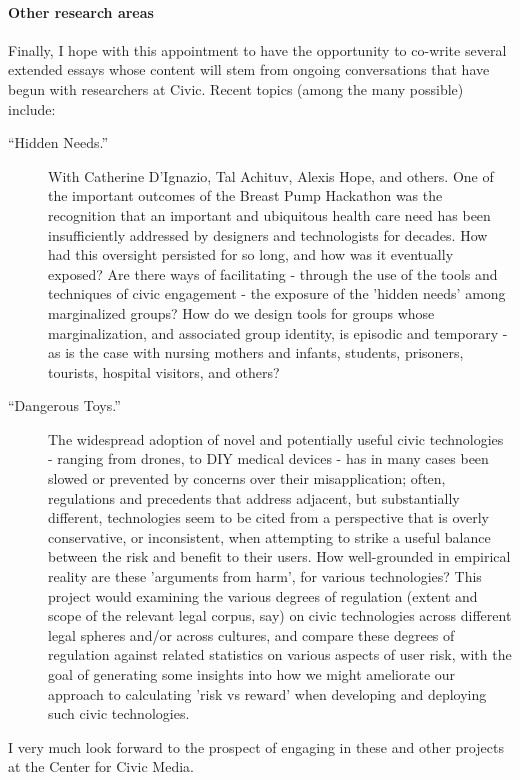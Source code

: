 \documentclass[10pt]{article}
\begin{document}

\paragraph{Other research areas} Finally, I hope with this appointment to have the opportunity to co-write several extended essays whose content will stem from ongoing conversations that have begun with researchers at Civic.  Recent topics (among the many possible) include: 

\begin{description}

\item[``Hidden Needs.''] With Catherine D'Ignazio, Tal Achituv, Alexis Hope, and others.  One of the important outcomes of the Breast Pump Hackathon was the recognition that an important and ubiquitous health care need has been insufficiently addressed by designers and technologists for decades. How had this oversight persisted for so long, and how was it eventually exposed?  Are there ways of facilitating - through the use of the tools and techniques of civic engagement - the exposure of the 'hidden needs' among marginalized groups?  How do we design tools for groups whose marginalization, and associated group identity, is episodic and temporary - as is the case with nursing mothers and infants, students, prisoners, tourists, hospital visitors, and others?

\item[``Dangerous Toys.''] The widespread adoption of novel and potentially useful civic technologies - ranging from drones, to DIY medical devices - has in many cases been slowed or prevented by concerns over their misapplication; often, regulations and precedents that address adjacent, but substantially different, technologies seem to be cited from a perspective that is overly conservative, or inconsistent, when attempting to strike a useful balance between the risk and benefit to their users. How well-grounded in empirical reality are these 'arguments from harm', for various technologies?  This project would examining the various degrees of regulation (extent and scope of the relevant legal corpus, say) on civic technologies across different legal spheres and/or across cultures, and compare these degrees of regulation against related statistics on various aspects of user risk, with the goal of generating some insights into how we might ameliorate our approach to calculating 'risk vs reward' when developing and deploying such civic technologies.  


\end{description}

I very much look forward to the prospect of engaging in these and other projects at the Center for Civic Media.
\end{document}
